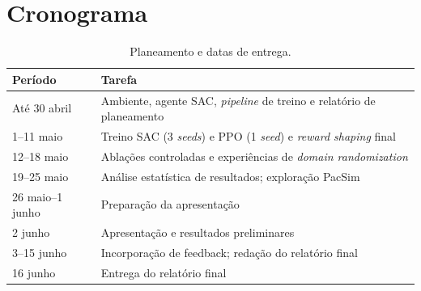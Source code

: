 \documentclass[runningheads]{llncs}
\begin{document}
\section{Cronograma}
\begin{table}[H]
\centering
\caption{Planeamento e datas de entrega.}
\label{tab:cronograma}
\begin{tabular}{ll}
\toprule
\textbf{Período} & \textbf{Tarefa} \\
\midrule
Até 30 abril & Ambiente, agente SAC, \textit{pipeline} de treino e relatório de planeamento \\
1--11 maio  & Treino SAC (3 \textit{seeds}) e PPO (1 \textit{seed}) e \textit{reward shaping} final \\
12--18 maio & Ablações controladas e experiências de \textit{domain randomization} \\
19--25 maio & Análise estatística de resultados; exploração PacSim \\
26 maio--1 junho & Preparação da apresentação \\
2 junho      & Apresentação e resultados preliminares \\
3--15 junho  & Incorporação de feedback; redação do relatório final \\
16 junho     & Entrega do relatório final \\
\bottomrule
\end{tabular}
\end{table}
\end{document}
